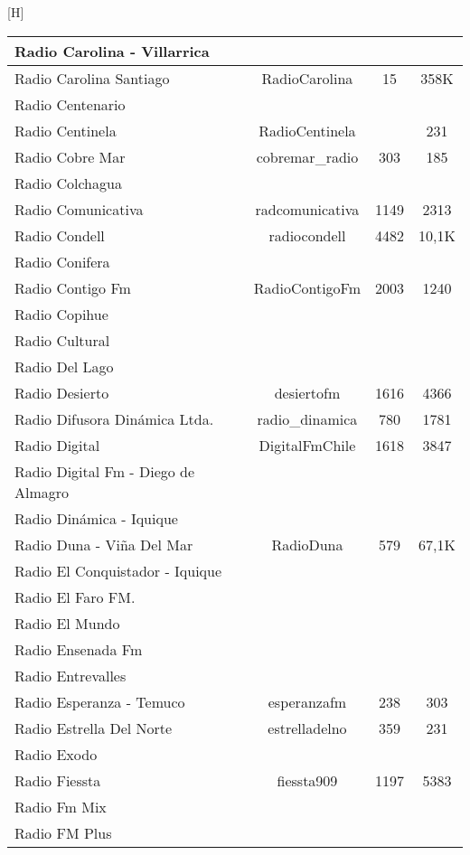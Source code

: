 \begin{center}[H]
\begin{longtable}{| l | c | c | c |}
Radio Carolina - Villarrica	&		&		&		\\ \hline
Radio Carolina Santiago	&	RadioCarolina	&	15	&	358K	\\ \hline
Radio Centenario	&		&		&		\\ \hline
Radio Centinela	&	RadioCentinela	&		&	231	\\ \hline
Radio Cobre Mar	&	cobremar\_radio	&	303	&	185	\\ \hline
Radio Colchagua	&		&		&		\\ \hline
Radio Comunicativa	&	radcomunicativa	&	1149	&	2313	\\ \hline
Radio Condell	&	radiocondell	&	4482	&	10,1K	\\ \hline
Radio Conifera	&		&		&		\\ \hline
Radio Contigo Fm	&	RadioContigoFm	&	2003	&	1240	\\ \hline
Radio Copihue	&		&		&		\\ \hline
Radio Cultural	&		&		&		\\ \hline
Radio Del Lago	&		&		&		\\ \hline
Radio Desierto	&	desiertofm	&	1616	&	4366	\\ \hline
Radio Difusora Dinámica Ltda.	&	radio\_dinamica	&	780	&	1781	\\ \hline
Radio Digital	&	DigitalFmChile	&	1618	&	3847	\\ \hline
Radio Digital Fm - Diego de Almagro	&		&		&		\\ \hline
Radio Dinámica - Iquique	&		&		&		\\ \hline
Radio Duna - Viña Del Mar	&	RadioDuna	&	579	&	67,1K	\\ \hline
Radio El Conquistador - Iquique	&		&		&		\\ \hline
Radio El Faro FM.	&		&		&		\\ \hline
Radio El Mundo	&		&		&		\\ \hline
Radio Ensenada Fm	&		&		&		\\ \hline
Radio Entrevalles	&		&		&		\\ \hline
Radio Esperanza - Temuco	&	esperanzafm	&	238	&	303	\\ \hline
Radio Estrella Del Norte	&	estrelladelno	&	359	&	231	\\ \hline
Radio Exodo	&		&		&		\\ \hline
Radio Fiessta	&	fiessta909	&	1197	&	5383	\\ \hline
Radio Fm Mix	&		&		&		\\ \hline
Radio FM Plus	&		&		&		\\ \hline

\end{longtable}
\end{center}
